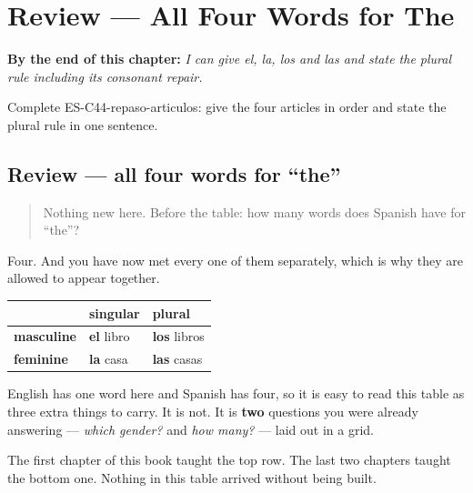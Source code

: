 
\chapter{Review --- All Four Words for The}
\label{ch:review-articles}

\begin{chapteropening}
\textbf{By the end of this chapter:} \emph{I can give el, la, los and las and state the plural rule including its consonant repair.}

Complete ES-C44-repaso-articulos: give the four articles in order and state the plural rule in one sentence.
\end{chapteropening}

\section[Practice]{Review — all four words for \textquotedblleft{}the\textquotedblright{}}

\label{lesson:ES-C44-repaso-articulos}



\begin{quote}
Nothing new here. Before the table: how many words does Spanish have for \textquotedblleft{}the\textquotedblright{}?
\end{quote}

\begin{grammarlens}[title={What you've built}]
Four. And you have now met every one of them separately, which is why they are allowed to appear together.

\noindent
\begin{tabularx}{\linewidth}{@{}>{\raggedright\arraybackslash}X>{\raggedright\arraybackslash}X>{\raggedright\arraybackslash}X@{}}
\toprule
\textbf{} & \textbf{singular} & \textbf{plural} \\
\midrule
\textbf{masculine} & \textbf{el} libro & \textbf{los} libros \\
\textbf{feminine} & \textbf{la} casa & \textbf{las} casas \\
\bottomrule
\end{tabularx}

English has one word here and Spanish has four, so it is easy to read this table as three extra things to carry. It is not. It is \textbf{two} questions you were already answering — \emph{which gender?} and \emph{how many?} — laid out in a grid.

The first chapter of this book taught the top row. The last two chapters taught the bottom one. Nothing in this table arrived without being built.
\end{grammarlens}

